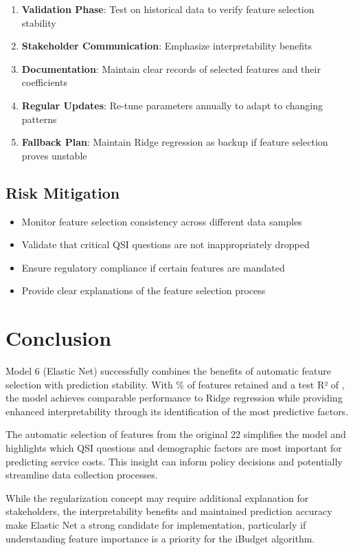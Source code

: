 \begin{enumerate}
    \item \textbf{Validation Phase}: Test on historical data to verify feature selection stability
    \item \textbf{Stakeholder Communication}: Emphasize interpretability benefits
    \item \textbf{Documentation}: Maintain clear records of selected features and their coefficients
    \item \textbf{Regular Updates}: Re-tune parameters annually to adapt to changing patterns
    \item \textbf{Fallback Plan}: Maintain Ridge regression as backup if feature selection proves unstable
\end{enumerate}

\subsection{Risk Mitigation}

\begin{itemize}
    \item Monitor feature selection consistency across different data samples
    \item Validate that critical QSI questions are not inappropriately dropped
    \item Ensure regulatory compliance if certain features are mandated
    \item Provide clear explanations of the feature selection process
\end{itemize}

\section{Conclusion}

Model 6 (Elastic Net) successfully combines the benefits of automatic feature selection with prediction stability. With \ModelSixSparsityPercent{}\% of features retained and a test R² of \ModelSixRSquaredTest{}, the model achieves comparable performance to Ridge regression while providing enhanced interpretability through its identification of the most predictive factors.

The automatic selection of \ModelSixFeaturesSelected{} features from the original 22 simplifies the model and highlights which QSI questions and demographic factors are most important for predicting service costs. This insight can inform policy decisions and potentially streamline data collection processes.

While the regularization concept may require additional explanation for stakeholders, the interpretability benefits and maintained prediction accuracy make Elastic Net a strong candidate for implementation, particularly if understanding feature importance is a priority for the iBudget algorithm.